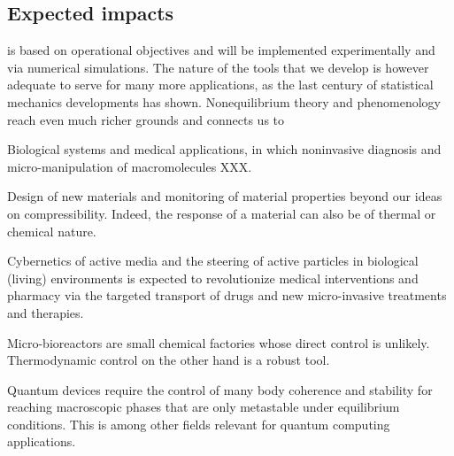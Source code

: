 \subsection{Expected impacts}


\TheProject is based on operational objectives and will be implemented experimentally and
via numerical simulations.
%
The nature of the tools that we develop is however adequate to serve for many more
applications, as the last century of statistical mechanics developments has shown.
%
Nonequilibrium theory and phenomenology reach even much richer grounds and connects us to
\begin{compactitem}
\item Biological systems and medical applications, in which noninvasive diagnosis and
micro-manipulation of macromolecules XXX.
\item Design of new materials and monitoring of material properties beyond our ideas on
compressibility. Indeed, the response of a material can also be of thermal or chemical
nature.
\item Cybernetics of active media and the steering of active particles in biological
(living) environments is expected to revolutionize medical interventions and pharmacy via
the targeted transport of drugs and new micro-invasive treatments and therapies.
\item Micro-bioreactors are small chemical factories whose direct control is
unlikely. Thermodynamic control on the other hand is a robust tool.
\item Quantum devices require the control of many body coherence and stability for reaching
macroscopic phases that are only metastable under equilibrium conditions. This is among
other fields relevant for quantum computing applications.
\end{compactitem}

